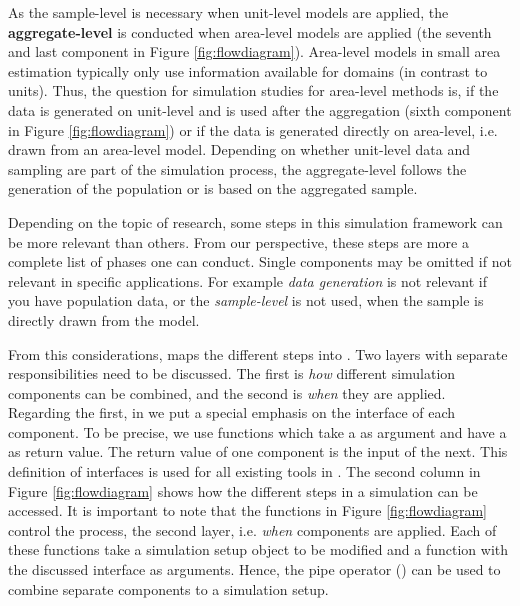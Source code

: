 \documentclass[article]{ajs}
\begin{document}
As the sample-level is necessary when unit-level models are applied, the \textbf{aggregate-level} is conducted when area-level models are applied (the seventh and last component in Figure \ref{fig:flowdiagram}). Area-level models in small area estimation typically only use information available for domains (in contrast to units). Thus, the question for simulation studies for area-level methods is, if the data is generated on unit-level and is used after the aggregation (sixth component in Figure \ref{fig:flowdiagram}) or if the data is generated directly on area-level, i.e. drawn from an area-level model. Depending on whether unit-level data and sampling are part of the simulation process, the aggregate-level follows the generation of the population or is based on the aggregated sample. %

Depending on the topic of research, some steps in this simulation framework can be more relevant than others. From our perspective, these steps are more a complete list of phases one can conduct. Single components may be omitted if not relevant in specific applications. For example \textit{data generation} is not relevant if you have population data, or the \textit{sample-level} is not used, when the sample is directly drawn from the model.

From this considerations,  maps the different steps into . Two layers with separate responsibilities need to be discussed. The first is \textit{how} different simulation components can be combined, and the second is \textit{when} they are applied. Regarding the first, in  we put a special emphasis on the interface of each component. To be precise, we use functions which take a  as argument and have a  as return value. The return value of one component is the input of the next. This definition of interfaces is used for all existing tools in . The second column in Figure \ref{fig:flowdiagram} shows how the different steps in a simulation can be accessed. It is important to note that the functions in Figure \ref{fig:flowdiagram} control the process, the second layer, i.e. \textit{when} components are applied. Each of these functions take a simulation setup object to be modified and a function with the discussed interface as arguments. Hence, the pipe operator (\proglang{\%>\%}) can be used to combine separate components to a simulation setup.
\end{document}
